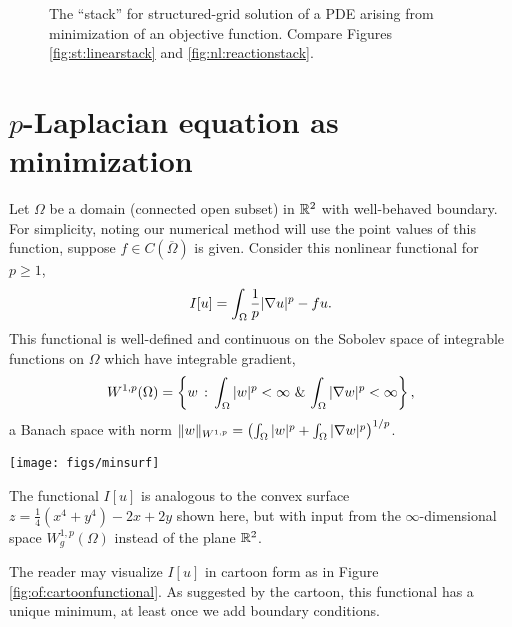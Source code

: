 \begin{figure}
\caption{The ``\PETSc stack'' for structured-grid solution of a PDE arising from minimization of an objective function.  Compare Figures \ref{fig:st:linearstack} and \ref{fig:nl:reactionstack}.}
\label{fig:of:standardstack}
\end{figure}


\section{$p$-Laplacian equation as minimization}

Let $\Omega$ be a domain (connected open subset) in $\mathbb{R}^2$ with well-behaved boundary.  For simplicity, noting our numerical method will use the point values of this function, suppose $f\in C(\overline \Omega)$ is given.  Consider this nonlinear functional for $p \ge 1$,
\begin{equation}
    I[u] = \int_\Omega \frac{1}{p} |\nabla u|^p - fu.  \label{eq:of:functional}
\end{equation}
This functional is well-defined and continuous on the Sobolev space \citep{AdamsFournier2003,Evans2010} of integrable functions on $\Omega$ which have integrable gradient,
\begin{equation}
    W^{1,p}(\Omega) = \left\{w \,:\, \int_\Omega |w|^p < \infty \,\, \& \, \int_\Omega |\nabla w|^p < \infty\right\}, \label{eq:of:sobolevdefn}
\end{equation}
a Banach space with norm $\|w\|_{W^{1,p}} = \left(\int_\Omega |w|^p + \int_\Omega |\nabla w|^p\right)^{1/p}$.

\begin{marginfigure}
\texttt{[image: figs/minsurf]} %
\medskip
\caption{The functional $I[u]$ is analogous to the convex surface $z = \tfrac{1}{4}(x^4 + y^4) - 2x + 2y$ shown here, but with input from the $\infty$-dimensional space $W_g^{1,p}(\Omega)$ instead of the plane $\mathbb{R}^2$.}
\label{fig:of:cartoonfunctional}
\end{marginfigure}

The reader may visualize $I[u]$ in cartoon form as in Figure \ref{fig:of:cartoonfunctional}.  As suggested by the cartoon, this functional has a unique minimum, at least once we add boundary conditions.

